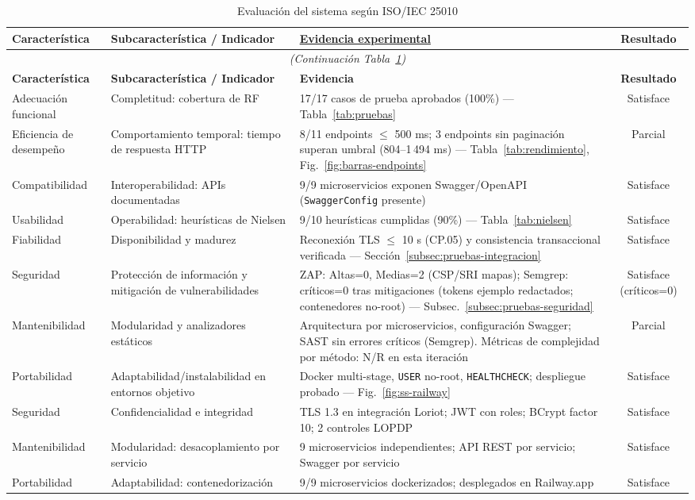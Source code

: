 \documentclass[12pt,a4paper,oneside]{report}
\begin{document}
\begin{longtable}{p{3.8cm}p{4.0cm}p{4.2cm}c}
\caption{Evaluación del sistema según ISO/IEC 25010}\label{tab:iso25010} \\
\toprule
\textbf{Característica} & \textbf{Subcaracterística / Indicador} & \textbf{\underline{Evidencia experimental}} & \textbf{Resultado} \\
\midrule
\endfirsthead
\multicolumn{4}{c}{\textit{(Continuación Tabla~\ref{tab:iso25010})}} \\
\toprule
\textbf{Característica} & \textbf{Subcaracterística / Indicador} & \textbf{Evidencia} & \textbf{Resultado} \\
\midrule
\endhead
\bottomrule
\endlastfoot
Adecuación funcional & Completitud: cobertura de RF & 17/17 casos de prueba aprobados (100\%) — Tabla~\ref{tab:pruebas} & Satisface \\
Eficiencia de desempeño & Comportamiento temporal: tiempo de respuesta HTTP & 8/11 endpoints $\leq$ 500 ms; 3 endpoints sin paginación superan umbral (804--1\,494 ms) — Tabla~\ref{tab:rendimiento}, Fig.~\ref{fig:barras-endpoints} & Parcial \\
Compatibilidad & Interoperabilidad: APIs documentadas & 9/9 microservicios exponen Swagger/OpenAPI (\texttt{SwaggerConfig} presente) & Satisface \\
Usabilidad & Operabilidad: heurísticas de Nielsen & 9/10 heurísticas cumplidas (90\%) — Tabla~\ref{tab:nielsen} & Satisface \\
Fiabilidad & Disponibilidad y madurez & Reconexión TLS $\leq$ 10 s (CP.05) y consistencia transaccional verificada — Sección~\ref{subsec:pruebas-integracion} & Satisface \\
Seguridad & Protección de información y mitigación de vulnerabilidades & ZAP: Altas=0, Medias=2 (CSP/SRI mapas); Semgrep: críticos=0 tras mitigaciones (tokens ejemplo redactados; contenedores no-root) — Subsec.~\ref{subsec:pruebas-seguridad} & Satisface (críticos=0) \\
Mantenibilidad & Modularidad y analizadores estáticos & Arquitectura por microservicios, configuración Swagger; SAST sin errores críticos (Semgrep). Métricas de complejidad por método: N/R en esta iteración & Parcial \\
Portabilidad & Adaptabilidad/instalabilidad en entornos objetivo & Docker multi-stage, \texttt{USER} no-root, \texttt{HEALTHCHECK}; despliegue probado — Fig.~\ref{fig:ss-railway} & Satisface \\
Seguridad & Confidencialidad e integridad & TLS 1.3 en integración Loriot; JWT con roles; BCrypt factor 10; 2 controles LOPDP & Satisface \\
Mantenibilidad & Modularidad: desacoplamiento por servicio & 9 microservicios independientes; API REST por servicio; Swagger por servicio & Satisface \\
Portabilidad & Adaptabilidad: contenedorización & 9/9 microservicios dockerizados; desplegados en Railway.app & Satisface \\
\end{longtable}
\end{document}
